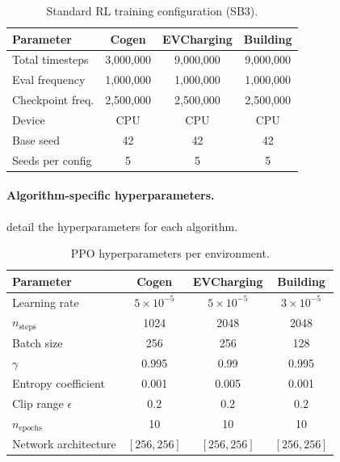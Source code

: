 \begin{table}[htbp]
\centering
\caption{Standard RL training configuration (SB3).}
\label{tab:training_config}
\begin{tabular}{@{}lccc@{}}
\toprule
\textbf{Parameter} & \textbf{Cogen} & \textbf{EVCharging} & \textbf{Building} \\
\midrule
Total timesteps & 3,000,000 & 9,000,000 & 9,000,000 \\
Eval frequency & 1,000,000 & 1,000,000 & 1,000,000 \\
Checkpoint freq. & 2,500,000 & 2,500,000 & 2,500,000 \\
Device & CPU & CPU & CPU \\
Base seed & 42 & 42 & 42 \\
Seeds per config & 5 & 5 & 5 \\
\bottomrule
\end{tabular}
\end{table}

\paragraph{Algorithm-specific hyperparameters.}  detail the hyperparameters for each algorithm.

\begin{table}[htbp]
\centering
\caption{PPO hyperparameters per environment.}
\label{tab:ppo_hyper}
\begin{tabular}{@{}lccc@{}}
\toprule
\textbf{Parameter} & \textbf{Cogen} & \textbf{EVCharging} & \textbf{Building} \\
\midrule
Learning rate & $5{\times}10^{-5}$ & $5{\times}10^{-5}$ & $3{\times}10^{-5}$ \\
$n_{\text{steps}}$ & 1024 & 2048 & 2048 \\
Batch size & 256 & 256 & 128 \\
$\gamma$ & 0.995 & 0.99 & 0.995 \\
Entropy coefficient & 0.001 & 0.005 & 0.001 \\
Clip range $\epsilon$ & 0.2 & 0.2 & 0.2 \\
$n_{\text{epochs}}$ & 10 & 10 & 10 \\
Network architecture & $[256, 256]$ & $[256, 256]$ & $[256, 256]$ \\
\bottomrule
\end{tabular}
\end{table}

